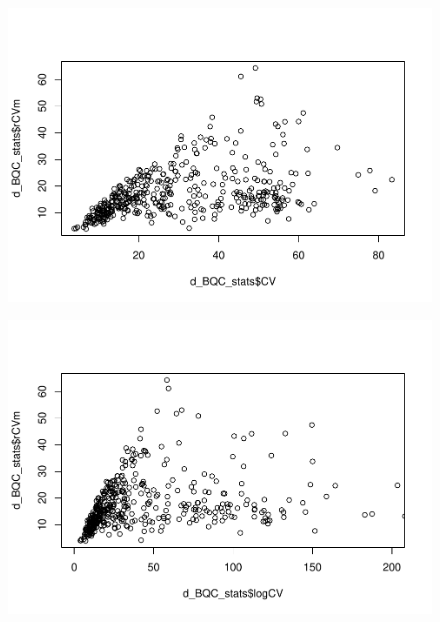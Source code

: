 \documentclass[
  letterpaper,
  DIV=11,
  numbers=noendperiod]{scrreprt}
\newenvironment{Shaded}{\begin{snugshade}}{\end{snugshade}}
\newcommand{\AttributeTok}[1]{\textcolor[rgb]{0.40,0.45,0.13}{#1}}
\newcommand{\DecValTok}[1]{\textcolor[rgb]{0.68,0.00,0.00}{#1}}
\newcommand{\FunctionTok}[1]{\textcolor[rgb]{0.28,0.35,0.67}{#1}}
\newcommand{\NormalTok}[1]{\textcolor[rgb]{0.00,0.23,0.31}{#1}}
\newcommand{\SpecialCharTok}[1]{\textcolor[rgb]{0.37,0.37,0.37}{#1}}
\begin{document}
\begin{figure}[H]

{\centering \includegraphics{./datawrangling_files/figure-pdf/calulcate-column-stats-7.pdf}

}

\end{figure}

\begin{Shaded}
\end{Shaded}

\begin{figure}[H]

{\centering \includegraphics{./datawrangling_files/figure-pdf/calulcate-column-stats-8.pdf}

}

\end{figure}
\end{document}
